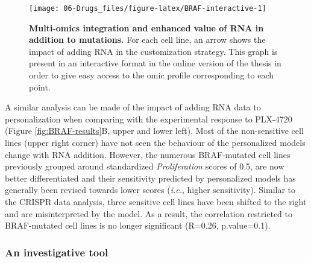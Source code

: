 \documentclass[a4paper,12pt,twoside,onecolumn,openright,final,oldfontcommands]{memoir}
\begin{document}
\begin{figure}

{\centering \texttt{[image: 06-Drugs\_files/figure-latex/BRAF-interactive-1]} 

}

\caption[Multi-omics integration and enhanced value of RNA in addition to mutations]{\textbf{Multi-omics integration and
enhanced value of RNA in addition to mutations.} For each cell line, an
arrow shows the impact of adding RNA in the customization strategy. This
graph is present in an interactive format in the online version of the
thesis in order to give easy access to the omic profile corresponding to
each point.}\label{fig:BRAF-interactive}
\end{figure}








A similar analysis can be made of the impact of adding RNA data to
personalization when comparing with the experimental response to
PLX-4720 (Figure \ref{fig:BRAF-results}B, upper and lower left). Most of
the non-sensitive cell lines (upper right corner) have not seen the
behaviour of the personalized models change with RNA addition. However,
the numerous BRAF-mutated cell lines previously grouped around
standardized \emph{Proliferation} scores of 0.5, are now better
differentiated and their sensitivity predicted by personalized models
has generally been revised towards lower scores (\emph{i.e.}, higher
sensitivity). Similar to the CRISPR data analysis, three sensitive cell
lines have been shifted to the right and are misinterpreted by the
model. As a result, the correlation restricted to BRAF-mutated cell
lines is no longer significant (R=0.26, p.value=0.1).

\subsubsection{An investigative tool}\label{an-investigative-tool}
\end{document}
